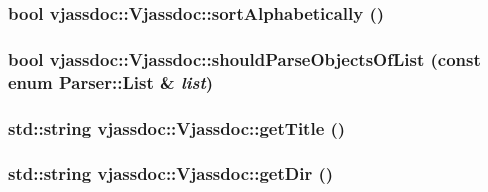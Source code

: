 \hypertarget{classvjassdoc_1_1Vjassdoc_6c9c4ca961a2c19801261be4c6f1922c}{
\subsubsection{\setlength{\rightskip}{0pt plus 5cm}bool vjassdoc::Vjassdoc::sortAlphabetically ()}}
\label{classvjassdoc_1_1Vjassdoc_6c9c4ca961a2c19801261be4c6f1922c}


\hypertarget{classvjassdoc_1_1Vjassdoc_d4502ac69ac8bd526d813606a7081d41}{
\subsubsection{\setlength{\rightskip}{0pt plus 5cm}bool vjassdoc::Vjassdoc::shouldParseObjectsOfList (const enum {\bf Parser::List} \& {\em list})}}
\label{classvjassdoc_1_1Vjassdoc_d4502ac69ac8bd526d813606a7081d41}


\hypertarget{classvjassdoc_1_1Vjassdoc_7ba3ab042719acc2ca719ea6936345bc}{
\subsubsection{\setlength{\rightskip}{0pt plus 5cm}std::string vjassdoc::Vjassdoc::getTitle ()}}
\label{classvjassdoc_1_1Vjassdoc_7ba3ab042719acc2ca719ea6936345bc}


\hypertarget{classvjassdoc_1_1Vjassdoc_212f33c8cf9c9be734cfbf9cfb040025}{
\subsubsection{\setlength{\rightskip}{0pt plus 5cm}std::string vjassdoc::Vjassdoc::getDir ()}}
\label{classvjassdoc_1_1Vjassdoc_212f33c8cf9c9be734cfbf9cfb040025}


